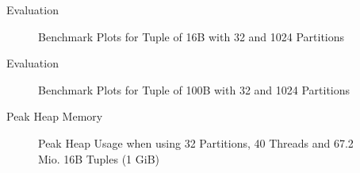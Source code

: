\begin{frame}{Evaluation}
  \begin{figure}[h]
    \centering
    \begin{subfigure}{.49\textwidth}
      \centering
      \resizebox{\linewidth}{!}{}
    \end{subfigure}
    \begin{subfigure}{.49\textwidth}
      \centering
      \resizebox{\linewidth}{!}{}
    \end{subfigure}
    \begin{subfigure}{\textwidth}
      \centering
      \resizebox{.85\linewidth}{!}{}
    \end{subfigure}
    \caption[Shuffle Benchmark Plots for Tuple of 16B with 32 and 1024 Partitions]{Benchmark Plots for Tuple of 16B with 32 and 1024 Partitions}
    \label{plot-shuffle-16B-32-1024}
  \end{figure}
\end{frame}

\begin{frame}{Evaluation}
  \begin{figure}[h]
    \centering
    \begin{subfigure}{.49\textwidth}
      \centering
      \resizebox{\linewidth}{!}{}
    \end{subfigure}
    \begin{subfigure}{.49\textwidth}
      \centering
      \resizebox{\linewidth}{!}{}
    \end{subfigure}
    \begin{subfigure}{\textwidth}
      \centering
      \resizebox{.85\linewidth}{!}{}
    \end{subfigure}
    \caption[Shuffle Benchmark Plots for Tuple of 100B with 32 and 1024 Partitions]{Benchmark Plots for Tuple of 100B with 32 and 1024 Partitions}
    \label{plot-shuffle-100B-32-1024}
  \end{figure}
\end{frame}
\begin{frame}{Peak Heap Memory}
  \begin{figure}[h]
    \centering
    \resizebox{.85\linewidth}{!}{}
    \caption[Peak Heap Memory Benchmark Plot]{Peak Heap Usage when using 32 Partitions, 40 Threads and 67.2 Mio.
      16B Tuples (1 GiB)} \label{plot-heap-16B-P32-Th40}
  \end{figure}
\end{frame}

